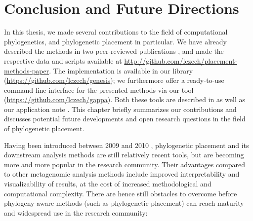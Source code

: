 
\chapter{Conclusion and Future Directions}
\label{ch:ConclusionFutureDirections}


In this thesis, we made several contributions to the field of computational phylogenetics,
and phylogenetic placement in particular.
We have already described the methods in two peer-reviewed publications \cite{Czech2018-phat,Czech2019-analysis},
and made the respective data and scripts available at \url{http://github.com/lczech/placement-methods-paper}.
The implementation is available in our  library (\url{https://github.com/lczech/genesis});
we furthermore offer a ready-to-use command line interface for the presented methods
via our  tool (\url{https://github.com/lczech/gappa}).
Both these tools are described in 
as well as our application note \cite{Czech2019-genesis-gappa}.
This chapter briefly summarizes our contributions and discusses potential future developments
and open research questions in the field of phylogenetic placement.

Having been introduced between 2009 and 2010 \cite{Berger2009,Matsen2010a},
phylogenetic placement and its downstream analysis methods are still relatively recent tools,
but are becoming more and more popular in the research community.
Their advantages compared to other metagenomic analysis methods
include improved interpretability and visualizability of results,
at the cost of increased methodological and computational complexity.
There are hence still obstacles to overcome before phylogeny-aware methods (such as phylogenetic placement)
can reach maturity and widespread use in the research community:

